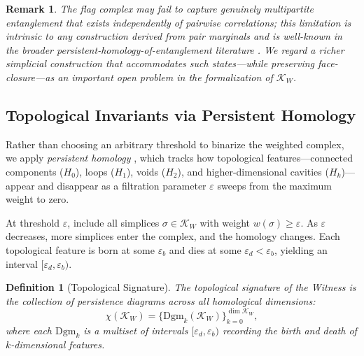 \documentclass[12pt, a4paper]{article}
\newtheorem{definition}{Definition}
\newtheorem{remark}{Remark}
\begin{document}
\begin{remark}
The flag complex may fail to capture genuinely multipartite entanglement that exists independently of pairwise correlations; this limitation is intrinsic to any construction derived from pair marginals and is well-known in the broader persistent-homology-of-entanglement literature \cite{DiPierro2018, HamiltonLeditzky2024}. We regard a richer simplicial construction that accommodates such states---while preserving face-closure---as an important open problem in the formalization of $\mathcal{K}_W$.
\end{remark}

\subsection{Topological Invariants via Persistent Homology}

Rather than choosing an arbitrary threshold to binarize the weighted complex, we apply \emph{persistent homology} \cite{Edelsbrunner2002, Zomorodian2005}, which tracks how topological features---connected components ($H_0$), loops ($H_1$), voids ($H_2$), and higher-dimensional cavities ($H_k$)---appear and disappear as a filtration parameter $\varepsilon$ sweeps from the maximum weight to zero.

At threshold $\varepsilon$, include all simplices $\sigma \in \mathcal{K}_W$ with weight $w(\sigma) \geq \varepsilon$. As $\varepsilon$ decreases, more simplices enter the complex, and the homology changes. Each topological feature is born at some $\varepsilon_b$ and dies at some $\varepsilon_d < \varepsilon_b$, yielding an interval $[\varepsilon_d, \varepsilon_b)$.

\begin{definition}[Topological Signature]
The \emph{topological signature} of the Witness is the collection of persistence diagrams across all homological dimensions:
\begin{equation}
\chi(\mathcal{K}_W) = \bigl\{ \mathrm{Dgm}_k(\mathcal{K}_W) \bigr\}_{k=0}^{\dim \mathcal{K}_W},
\label{eq:persistence}
\end{equation}
where each $\mathrm{Dgm}_k$ is a multiset of intervals $[\varepsilon_d, \varepsilon_b)$ recording the birth and death of $k$-dimensional features.
\end{definition}
\end{document}
